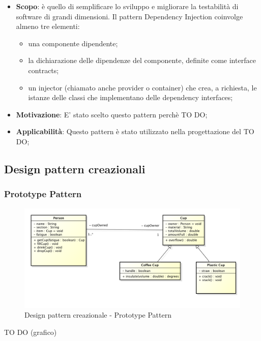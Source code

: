 		
		\begin{itemize}
			\item \textbf{Scopo}: è quello di semplificare lo sviluppo e migliorare la testabilità di software di grandi 		dimensioni.
Il pattern Dependency Injection coinvolge almeno tre elementi:

				\begin{itemize}
					\item una componente dipendente;
					\item la dichiarazione delle dipendenze del componente, definite come interface contracts;
					\item un injector (chiamato anche provider o container) che crea, a richiesta, le istanze delle classi che implementano delle dependency interfaces;
				\end{itemize}
			
			\item \textbf{Motivazione}: E' stato scelto questo pattern perchè TO DO;
			
			\item \textbf{Applicabilità}: Questo pattern è stato utilizzato nella progettazione del TO DO;
			
		\end{itemize}
		


	\clearpage 
	\newpage
	\subsection{Design pattern creazionali} %
	
		\subsubsection{Prototype Pattern} %

		\begin{figure}[htbp]
			\centering
			\centerline{\includegraphics[scale=0.3]{./images/example_graph.png}}
			\caption{Design pattern creazionale - Prototype Pattern}
		\end{figure}
		TO DO (grafico)
		
